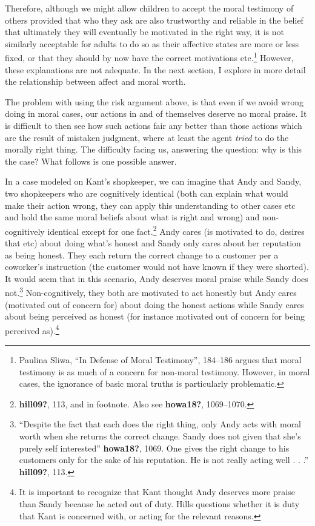 \documentclass[phdthesis,12pt,final]{wuthesis}
\theoremstyle{definition}
\theoremstyle{definition}
\theoremstyle{definition}
\theoremstyle{definition}
\theoremstyle{remark}
\begin{document}
Therefore, although we might allow children to accept the moral testimony of others provided that who they ask are also trustworthy and reliable in the belief that ultimately they will eventually be motivated in the right way, it is not similarly acceptable for adults to do so as their affective states are more or less fixed, or that they should by now have the correct motivations etc.\footnote{Paulina Sliwa, {``In Defense of Moral Testimony''}, 184--186 argues that moral testimony is as much of a concern for non-moral testimony. However, in moral cases, the ignorance of basic moral truths is particularly problematic.} However, these explanations are not adequate. In the next section, I explore in more detail the relationship between affect and moral worth.

The problem with using the risk argument above, is that even if we avoid wrong doing in moral cases, our actions in and of themselves deserve no moral praise. It is difficult to then see how such actions fair any better than those actions which are the result of mistaken judgment, where at least the agent \emph{tried} to do the morally right thing. The difficulty facing us, answering the question: why is this the case? What follows is one possible answer.

In a case modeled on Kant's shopkeeper, we can imagine that Andy and Sandy, two shopkeepers who are cognitively identical (both can explain what would make their action wrong, they can apply this understanding to other cases etc and hold the same moral beliefs about what is right and wrong) and non-cognitively identical except for one fact.\footnote{\textbf{hill09?}, 113, and in footnote. Also see \textbf{howa18?}, 1069--1070.} Andy cares (is motivated to do, desires that etc) about doing what's honest and Sandy only cares about her reputation as being honest. They each return the correct change to a customer per a coworker's instruction (the customer would not have known if they were shorted). It would seem that in this scenario, Andy deserves moral praise while Sandy does not.\footnote{``Despite the fact that each does the right thing, only Andy acts with moral worth when she returns the correct change. Sandy does not given that she's purely self interested'' \textbf{howa18?}, 1069. One gives the right change to his customers only for the sake of his reputation. He is not really acting well . . .'' \textbf{hill09?}, 113.} Non-cognitively, they both are motivated to act honestly but Andy cares (motivated out of concern for) about doing the honest actions while Sandy cares about being perceived as honest (for instance motivated out of concern for being perceived as).\footnote{It is important to recognize that Kant thought Andy deserves more praise than Sandy because he acted out of duty. Hills questions whether it is duty that Kant is concerned with, or acting for the relevant reasons.}
\end{document}
